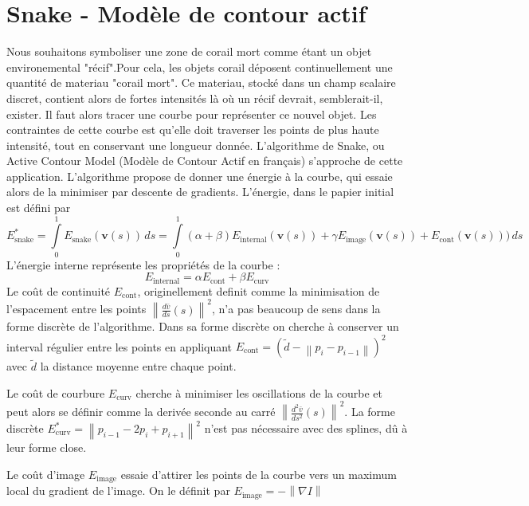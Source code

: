 \newcommand{\Esnake}{E_{\text{snake}}}
\newcommand{\Eintern}{E_{\text{internal}}}
\newcommand{\Eextern}{E_{\text{external}}}
\newcommand{\Econt}{E_{\text{cont}}}
\newcommand{\Eimage}{E_{\text{image}}}
\newcommand{\Ecurv}{E_{\text{curv}}}

\chapter{Snake - Modèle de contour actif}

Nous souhaitons symboliser une zone de corail mort comme étant un objet environemental "récif".Pour cela, les objets corail déposent continuellement une quantité de materiau "corail mort". Ce materiau, stocké dans un champ scalaire discret, contient alors de fortes intensités là où un récif devrait, semblerait-il, exister.
Il faut alors tracer une courbe pour représenter ce nouvel objet. Les contraintes de cette courbe est qu'elle doit traverser les points de plus haute intensité, tout en conservant une longueur donnée.
L'algorithme de Snake, ou Active Contour Model (Modèle de Contour Actif en français) s'approche de cette application. L'algorithme propose de donner une énergie à la courbe, qui essaie alors de la minimiser par descente de gradients.
L'énergie, dans le papier initial est défini  par 
$$
\Esnake^{*} = \int \limits _{0}^{1} \Esnake(\mathbf {v} (s))\,ds = \int \limits _{0}^{1} \left( \alpha + \beta \right) \Eintern (\mathbf {v} (s)) + \gamma \Eimage (\mathbf {v} (s)) + \Econt (\mathbf {v} (s)))\,ds
$$
L'énergie interne représente les propriétés de la courbe : 
$$
\Eintern = \alpha \Econt + \beta \Ecurv
$$
Le coût de continuité $\Econt$, originellement definit comme la minimisation de l'espacement entre les points $\left\|{\frac {d{\bar {v}}}{ds}}(s)\right\| ^{2}$, n'a pas beaucoup de sens dans la forme discrète de l'algorithme. Dans sa forme discrète on cherche à conserver un interval régulier entre les points en appliquant $\Econt = \left(\tilde{d} - \left\|p_i - p_{i-1} \right\| \right)^2$ avec $\tilde{d}$ la distance moyenne entre chaque point.

Le coût de courbure $\Ecurv$ cherche à minimiser les oscillations de la courbe et peut alors se définir comme la derivée seconde au carré $\left\|{\frac {d^{2}{\bar {v}}}{ds^{2}}}(s)\right\| ^{2}$.
La forme discrète $\Ecurv^{*} = \left\| p_{i-1} - 2 p_i + p_{i+1} \right\| ^2$ n'est pas nécessaire avec des splines, dû à leur forme close.

Le coût d'image $\Eimage$ essaie d'attirer les points de la courbe vers un maximum local du gradient de l'image. On le définit par $\Eimage = - \left\| \nabla I \right\| $

